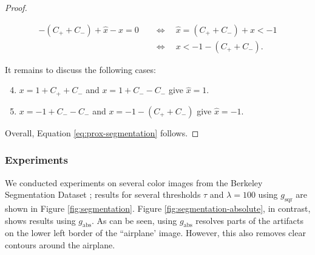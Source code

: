 \documentclass[onecolumn,final,a4paper,13pt,reqno]{siamart}
\begin{document}
\begin{proof}
\begin{enumerate}[label=\arabic*)]
		\begin{align}
			-(C_+ + C_-) + \hat{x} - x = 0 \quad&\Leftrightarrow\quad \hat{x} = (C_+ + C_-) + x < -1\\
			&\Leftrightarrow\quad x < -1 - (C_+ + C_-).
		\end{align}
	\end{enumerate}
	It remains to discuss the following cases:
	\begin{enumerate}[label=\arabic*)]
		\setcounter{enumi}{3}
		\item $x = 1 + C_+ + C_-$ and $x = 1 + C_- - C_-$ give $\hat{x} = 1$.
		\item $x = -1 + C_- - C_-$ and $x = -1 - (C_+ + C_-)$ give $\hat{x} = -1$.
	\end{enumerate}
	Overall, Equation \eqref{eq:prox-segmentation} follows.
\end{proof}

\subsubsection{Experiments}

We conducted experiments on several color images from the Berkeley Segmentation Dataset \cite{ArbelaezMaireFowlkesMalik:2011}; results for several thresholds $\tau$ and $\lambda = 100$ using $g_{\text{sqr}}$ are shown in Figure \ref{fig:segmentation}. Figure \ref{fig:segmentation-absolute}, in contrast, shows results using $g_{\text{abs}}$. As can be seen, using $g_{\text{abs}}$ resolves parts of the artifacts on the lower left border of the ``airplane' image. However, this also removes clear contours around the airplane.
\end{document}
